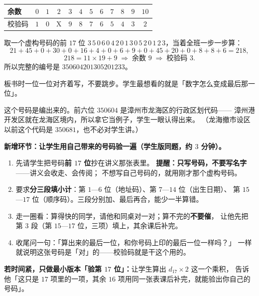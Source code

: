 \begin{center}
\begin{tabular}{@{}l*{11}{c}@{}}
  \toprule
  余数 & \(0\) & \(1\) & \(2\) & \(3\) & \(4\) & \(5\) & \(6\) & \(7\) & \(8\) & \(9\) & \(10\) \\
  \midrule
  校验码 & \(1\) & \(0\) & X & \(9\) & \(8\) & \(7\) & \(6\) & \(5\) & \(4\) & \(3\) & \(2\) \\
  \bottomrule
\end{tabular}
\end{center}

\begin{caozuo}
  取一个虚构号码的前 \(17\) 位 \(3\,5\,0\,6\,0\,4\,2\,0\,1\,3\,0\,5\,2\,0\,1\,2\,3\)，当着全班一步一步算：
  \[
    21+45+0+30+0+16+4+0+6+9+0+45+20+0+8+8+6=218,
  \]
  \[
    218=11\times19+9 \;\Longrightarrow\; \text{余数 }9 \;\Longrightarrow\; \text{校验码 }3 .
  \]
  所以完整的编号是 \(350604201305201233\)。
\end{caozuo}

\begin{zhu}
  板书时一位一位对齐着写，不要跳步。学生最想看的就是「数字怎么变成最后那一位」。
\end{zhu}

\begin{zhu}
  这个号码是编出来的。前六位 \(350604\) 是漳州市龙海区的行政区划代码——
  漳州港开发区就在龙海区境内，所以拿它当例子，学生一眼认得出来。
  （龙海撤市设区以前这个代码是 \(350681\)，也不必对学生讲。）
\end{zhu}

\begin{caozuo}
  \textbf{新增环节：让学生用自己带来的号码验一遍（学生版同题，约 \(3\) 分钟）。}
  \begin{enumerate}
    \item 先请学生把号码\textbf{前 \(17\) 位}抄在讲义那张表里。
      \textbf{提醒：只写号码，不要写名字}——讲义会收走、会传阅；
      不想写自己号码的，就用刚才那个虚构号码。
    \item 要求\textbf{分三段填小计}：第 \(1\)—\(6\) 位（地址码）、第 \(7\)—\(14\) 位（出生日期）、
      第 \(15\)—\(17\) 位（顺序码）。三段分别加、最后再合，能少一半算错。
    \item 走一圈看：算得快的同学，请他和同桌对一对；算不完的\textbf{不要催}，
      让他先把第 \(3\) 段（第 \(15\)—\(17\) 位，三项）填上，其余课后补完。
    \item 收尾问一句：「算出来的最后一位，和你号码上印的最后一位一样吗？」
      一样就说明这张号码是「对」的——校验码就是干这个用的。
  \end{enumerate}
  \textbf{若时间紧，只做最小版本「验第 \(17\) 位」：}让学生算出 \(d_{17}\times2\) 这一个乘积，
  告诉他「这只是 \(17\) 项里的一项，其余 \(16\) 项用同一张表课后补完，就能验出你自己的号码」。
\end{caozuo}

